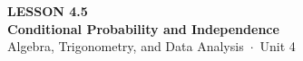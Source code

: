 \documentclass[aspectratio=169, 11pt]{beamer}
\begin{document}
{
\begin{frame}[plain]
  \vspace{2.8cm}\hspace{0.55cm}%
  \begin{minipage}{0.9\textwidth}
    {\color{goldacc}\bfseries\small LESSON 4.5}\\[0.5cm]
    {\color{white}\bfseries\LARGE Conditional Probability and Independence}\\[1.2cm]
    {\color{mistmid}\small Algebra, Trigonometry, and Data Analysis~$\cdot$~Unit 4}
  \end{minipage}
\end{frame}
}

\begin{frame}[t, plain]
\end{frame}
\end{document}

